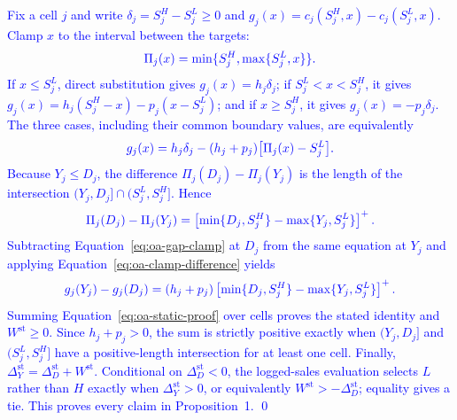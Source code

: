 \documentclass[msom,dblanonrev]{informs4}
\newcommand{\add}[1]{\textcolor{blue}{#1}}
\begin{document}
\proof{\add{Proof of Proposition 1.}}
\add{Fix a cell $j$ and write $\delta_j=S_j^H-S_j^L\geq0$ and $g_j(x)=c_j(S_j^H,x)-c_j(S_j^L,x)$. Clamp $x$ to the interval between the targets:}
\begin{equation}\label{eq:oa-clamp}
\add{\Pi_j(x)=\min\{S_j^H,\max\{S_j^L,x\}\}.}
\end{equation}
\add{If $x\leq S_j^L$, direct substitution gives $g_j(x)=h_j\delta_j$; if $S_j^L<x<S_j^H$, it gives $g_j(x)=h_j(S_j^H-x)-p_j(x-S_j^L)$; and if $x\geq S_j^H$, it gives $g_j(x)=-p_j\delta_j$. The three cases, including their common boundary values, are equivalently}
\begin{equation}\label{eq:oa-gap-clamp}
\add{g_j(x)=h_j\delta_j-(h_j+p_j)\bigl[\Pi_j(x)-S_j^L\bigr].}
\end{equation}
\add{Because $Y_j\leq D_j$, the difference $\Pi_j(D_j)-\Pi_j(Y_j)$ is the length of the intersection $(Y_j,D_j]\cap(S_j^L,S_j^H]$. Hence}
\begin{equation}\label{eq:oa-clamp-difference}
\add{\Pi_j(D_j)-\Pi_j(Y_j)=\left[\min\{D_j,S_j^H\}-\max\{Y_j,S_j^L\}\right]^+.}
\end{equation}
\add{Subtracting Equation~\eqref{eq:oa-gap-clamp} at $D_j$ from the same equation at $Y_j$ and applying Equation~\eqref{eq:oa-clamp-difference} yields}
\begin{equation}\label{eq:oa-static-proof}
\add{g_j(Y_j)-g_j(D_j)=(h_j+p_j)\left[\min\{D_j,S_j^H\}-\max\{Y_j,S_j^L\}\right]^+.}
\end{equation}
\add{Summing Equation~\eqref{eq:oa-static-proof} over cells proves the stated identity and $W^{\mathrm{st}}\geq0$. Since $h_j+p_j>0$, the sum is strictly positive exactly when $(Y_j,D_j]$ and $(S_j^L,S_j^H]$ have a positive-length intersection for at least one cell. Finally, $\Delta_Y^{\mathrm{st}}=\Delta_D^{\mathrm{st}}+W^{\mathrm{st}}$. Conditional on $\Delta_D^{\mathrm{st}}<0$, the logged-sales evaluation selects $L$ rather than $H$ exactly when $\Delta_Y^{\mathrm{st}}>0$, or equivalently $W^{\mathrm{st}}> -\Delta_D^{\mathrm{st}}$; equality gives a tie. This proves every claim in Proposition~1. \qed}
\endproof
\end{document}
